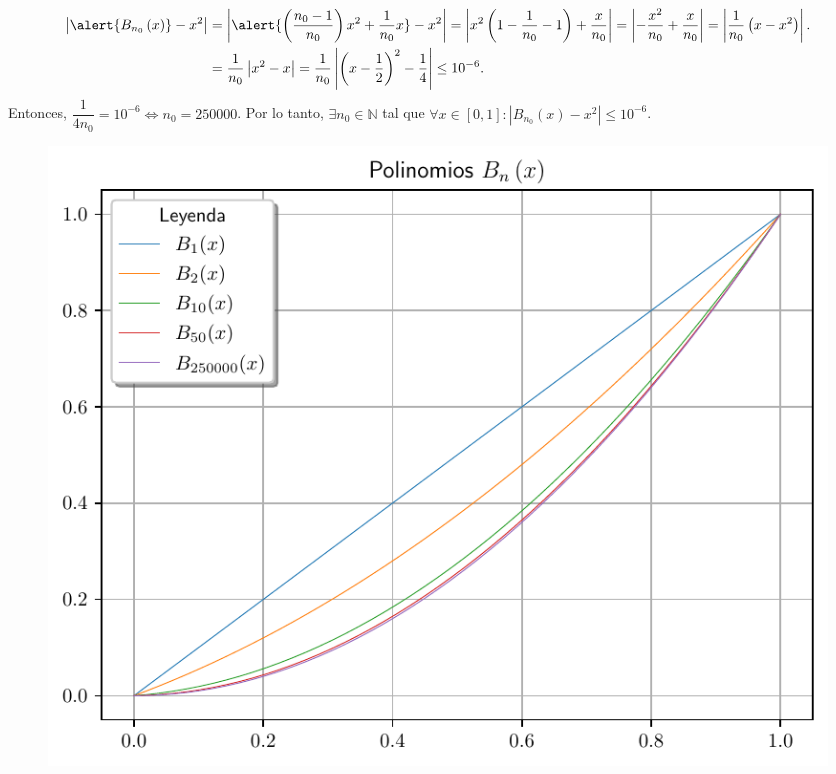 \begin{frame}
\begin{solution}
		\begin{align*}
			\left|
			\alert{
				B_{n_{0}}\left(x\right)
			}
			-x^{2}
			\right| & =
			\left|
			\alert{
			\left(\dfrac{n_{0}-1}{n_{0}}\right)x^{2}+
			\dfrac{1}{n_{0}}x
			}
			-x^{2}
			\right|=
			\left|
			x^{2}\left(1-\dfrac{1}{n_{0}}-1\right)+\dfrac{x}{n_{0}}
			\right|=
			\left|
			-\dfrac{x^{2}}{n_{0}}+\dfrac{x}{n_{0}}
			\right|
			=\left|
			\dfrac{1}{n_{0}}
			\left(x-x^{2}\right)
			\right|.    \\
			        & =
			\dfrac{1}{n_{0}}
			\left|
			x^{2}-x
			\right|=
			\dfrac{1}{n_{0}}
			\left|
			{\left(x-\dfrac{1}{2}\right)}^{2}-
			\dfrac{1}{4}
			\right|\leq
			10^{-6}.
		\end{align*}
		Entonces,
		\begin{math}
			\dfrac{1}{4n_{0}}=10^{-6}\iff n_{0}=250000
		\end{math}.
		Por lo tanto,
		\begin{math}
			\exists n_{0}\in\mathbb{N}
		\end{math}
		tal que
		\begin{math}
			\forall x\in\left[0,1\right]:
			\left|B_{n_{0}}\left(x\right)-x^{2}\right|\leq
			10^{-6}
		\end{math}.
	\end{solution}
\end{frame}

\begin{frame}
	\begin{solution}
		\begin{figure}[ht!]
			\centering
			\includegraphics[width=.72\paperwidth]{p4}
		\end{figure}
	\end{solution}
\end{frame}